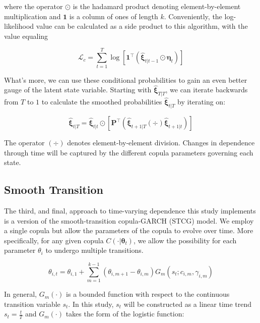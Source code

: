 \documentclass[12pt]{article}
\newcommand{\Lagr}{\mathcal{L}}
\newcommand{\boldXi}{\hat{\boldsymbol{\xi}}}
\begin{document}
where the operator $\odot$ is the hadamard product denoting element-by-element
multiplication and $\mathbf{1}$ is a column of ones of length $k$.
Conveniently, the log-likelihood value can be calculated as a side product
to this algorithm, with the value equaling

\begin{equation}
\Lagr_{c} = \sum_{t=1}^{T}\log \left[\mathbf{1}^{\top}\left(\boldXi_{t|t-1} \odot \boldsymbol{\eta}_{t}\right)\right] 
\end{equation}

What's more, we can use these conditional probabilities to gain an even
better gauge of the latent state variable. Starting with $\boldXi_{T|T}$,
we can iterate backwards from $T$ to $1$ to calculate the smoothed
probabilities $\boldXi_{t|T}$ by iterating on:

\begin{equation}
\boldXi_{t|T} = \boldXi_{t|t} \odot \left[\mathbf{P}^{\top}\left(\boldXi_{t+1|T}\left(\div\right)\boldXi_{t+1|t}\right)\right]
\end{equation}

The operator $\left(\div\right)$ denotes element-by-element division.
Changes in dependence through time will be captured by the different
copula parameters governing each state.

\subsection{Smooth Transition}

The third, and final, approach to time-varying dependence this study
implements is a version of the smooth-transition copula-GARCH (STCG) model.
We employ a single copula but allow the parameters of the copula to evolve
over time. More specifically, for any given copula
$C\left(\cdot | \mathbf{\theta}_{t}\right)$, we allow the possibility for
each parameter $\theta_{i}$ to undergo multiple transitions.

\begin{equation} \label{eqn:smoothTrans}
\theta_{i,t} = \theta_{i,1} + \sum_{m=1}^{k-1}\left(\theta_{i,m+1} - \theta_{i,m}\right) G_{m}\left(s_{t}; c_{i,m},\gamma_{i,m}\right)
\end{equation}

In general, $G_{m}\left(\cdot\right)$ is a bounded function with respect
to the continuous transition variable $s_{t}$. In this study, $s_{t}$ will
be constructed as a linear time trend $s_{t}=\frac{t}{T}$ and
$G_{m}\left(\cdot\right)$ takes the form of the logistic function:
\end{document}
